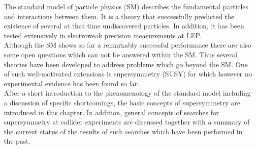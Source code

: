 The standard model of particle physics (SM) describes the fundamental particles and interactions between them. It is a theory that successfully predicted the existence of several at that time undiscovered particles. In addition, it has been tested extensively in electroweak precision measurements at LEP. \\
Although the SM shows so far a remarkably successful performance there are also some open questions which can not be answered within the SM. Thus several theories have been developed to address problems which go beyond the SM. One of such well-motivated extensions is supersymmetry (SUSY) for which however no experimental evidence has been found so far. \\
After a short introduction to the phenomenology of the standard model including a discussion of specific shortcomings, the basic concepts of supersymmetry are introduced in this chapter. In addition, general concepts of searches for supersymmetry at collider experiments are discussed together with a summary of the current status of the results of such searches which have been performed in the past.
